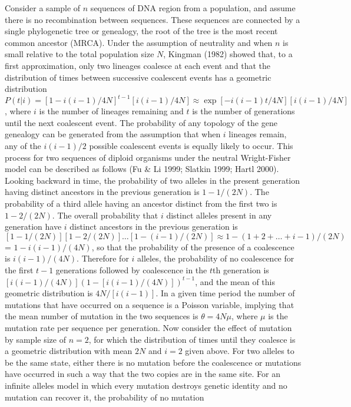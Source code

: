 Consider a sample of $n$ sequences of DNA region from a population, and assume
there is no recombination between sequences.  These sequences are connected by
a single phylogenetic tree or genealogy, the root of the tree is the most
recent common ancestor (MRCA).  Under the assumption of neutrality and when $n$
is small relative to the total population size $N$, Kingman (1982) showed that,
to a first approximation, only two lineages coalesce at each event and that the
distribution of times between successive coalescent events has a geometric
distribution $P(t|i)=[1-i(i-1)/4N]^{t-1}[i(i-1)/4N]
\approx\exp[-i(i-1)t/4N][i(i-1)/4N]$, where $i$ is the number of lineages
remaining and $t$ is the number of generations until the next coalescent event.
The probability of any topology of the gene genealogy can be generated from the
assumption that when $i$ lineages remain, any of the $i(i-1)/2$ possible
coalescent events is equally likely to occur.  This process for two sequences
of diploid organisms under the neutral Wright-Fisher model can be described as
follows (Fu \& Li 1999; Slatkin 1999; Hartl 2000).  Looking backward in time,
the probability of two alleles in the present generation having distinct
ancestors in the previous generation is $1-1/(2N)$.  The probability of a third
allele having an ancestor distinct from the first two is $1-2/(2N)$.  The
overall probability that $i$ distinct alleles present in any generation have
$i$ distinct ancestors in the previous generation is
$[1-1/(2N)][1-2/(2N)]\ldots [1-(i-1)/(2N)]\approx 1-(1+2+\ldots+i-1)/(2N)$=
$1-i(i-1)/(4N)$, so that the probability of the presence of a coalescence is
$i(i-1)/(4N)$.  Therefore for $i$ alleles, the probability of no coalescence
for the first $t-1$ generations followed by coalescence in the $t$th generation
is $[i(i-1)/(4N)](1-[i(i-1)/(4N)])^{t-1}$, and the mean of this geometric
distribution is $4N/[i(i-1)]$.  In a given time period the number of mutations
that have occurred on a sequence is a Poisson variable, implying that the mean
number of mutation in the two sequences is $\theta=4N\mu$, where $\mu$ is the
mutation rate per sequence per generation.  Now consider the effect of mutation
by sample size of $n=2$, for which the distribution of times until they
coalesce is a geometric distribution with mean $2N$ and $i=2$ given above.  For
two alleles to be the same state, either there is no mutation before the
coalescence or mutations have occurred in such a way that the two copies are in
the same site.  For an infinite alleles model in which every mutation destroys
genetic identity and no mutation can recover it, the probability of no mutation
